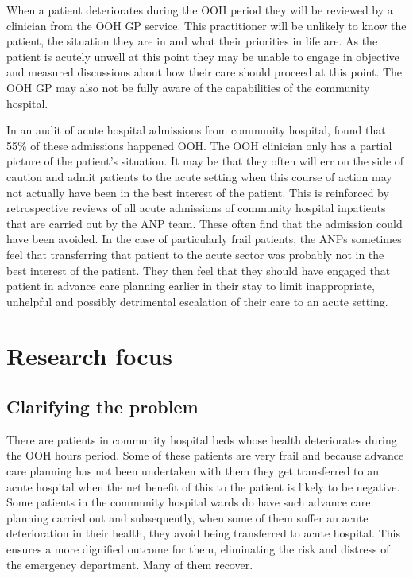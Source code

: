 \documentclass
[
	12pt,
	a4paper,
	oneside,
]{report}
\begin{document}
When a patient deteriorates during the OOH period they will be reviewed by a clinician
from the OOH GP service. This practitioner will be unlikely to know the patient,
the situation they are in and what their priorities in life are. As the patient is
acutely unwell at this point they may be unable to engage in objective and measured
discussions about how their care should proceed at this point. The OOH GP may also
not be fully aware of the capabilities of the community hospital. 

In an audit of acute hospital admissions from community hospital,
\textcite{endacott:15} found that 55\% of these admissions happened OOH. 
The OOH clinician only has a partial picture of the patient's situation. It may 
be that they often will err on the side of caution and
admit patients to the acute setting when this course of action may not actually have
been in the best interest of the patient. This is reinforced by retrospective reviews
of all acute admissions of community hospital inpatients that are carried out by the 
ANP team. These often find that the admission could have been avoided. In the case
of particularly frail patients, the ANPs sometimes feel that transferring that
patient to the acute sector was probably not in the best interest of the patient. 
They then feel that they should have engaged that patient in advance care planning
earlier in their stay to limit inappropriate, unhelpful and possibly detrimental 
escalation of their care to an acute setting.

\section{Research focus}

\subsection{Clarifying the problem}

There are patients in community hospital beds whose health deteriorates during
the OOH hours period. Some of these patients are very frail and because advance
care planning has not been undertaken with them they get transferred to an acute 
hospital when the net benefit of this to the patient is likely to be negative.
Some patients in the community hospital wards do have such advance care planning 
carried out and subsequently, when some of them suffer an acute deterioration in
their health, they avoid being transferred to acute hospital. This ensures a more
dignified outcome for them, eliminating the risk and distress of the emergency
department. Many of them recover.
\end{document}

